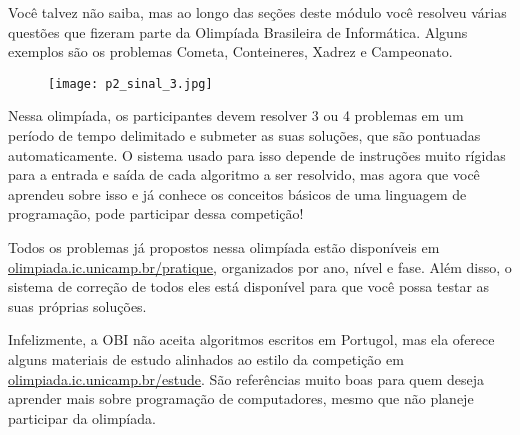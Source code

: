 \label{comp-know6}

Você talvez não saiba, mas ao longo das seções deste módulo você resolveu várias questões que fizeram parte da Olimpíada Brasileira de Informática. Alguns exemplos são os problemas Cometa, Conteineres, Xadrez e Campeonato.

\begin{figure}[H]
\centering

\texttt{[image: p2\_sinal\_3.jpg]}
\end{figure}

Nessa olimpíada, os participantes devem resolver 3 ou 4 problemas em um período de tempo delimitado e submeter as suas soluções, que são pontuadas automaticamente. O sistema usado para isso depende de instruções muito rígidas para a entrada e saída de cada algoritmo a ser resolvido, mas agora que você aprendeu sobre isso e já conhece os conceitos básicos de uma linguagem de programação, pode participar dessa competição!

Todos os problemas já propostos nessa olimpíada estão disponíveis em \url{olimpiada.ic.unicamp.br/pratique}, organizados por ano, nível e fase. Além disso, o sistema de correção de todos eles está disponível para que você possa testar as suas próprias soluções.

Infelizmente, a OBI não aceita algoritmos escritos em Portugol, mas ela oferece alguns materiais de estudo alinhados ao estilo da competição em \url{olimpiada.ic.unicamp.br/estude}. São referências muito boas para quem deseja aprender mais sobre programação de computadores, mesmo que não planeje participar da olimpíada.


\ifnum{}
\clearpage
\else
\notasfinais
\fi




\nocite{*}
